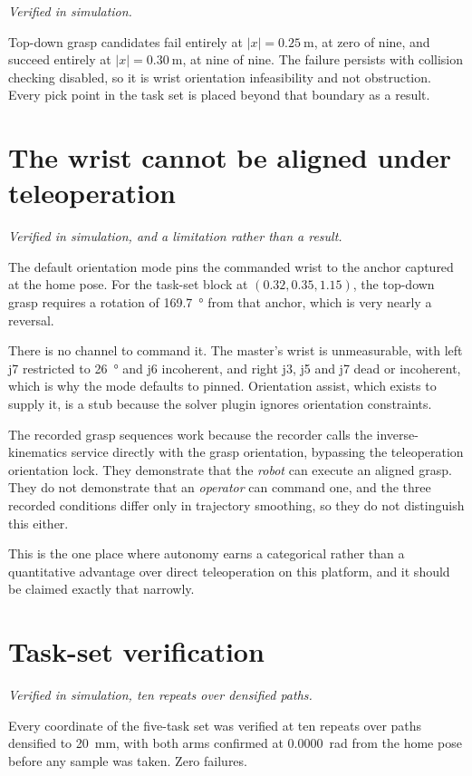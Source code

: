 \emph{Verified in simulation.}

Top-down grasp candidates fail entirely at $|x| = \SI{0.25}{\metre}$, at zero
of nine, and succeed entirely at $|x| = \SI{0.30}{\metre}$, at nine of nine.
The failure persists with collision checking disabled, so it is wrist
orientation infeasibility and not obstruction. Every pick point in the task
set is placed beyond that boundary as a result.

\section{The wrist cannot be aligned under teleoperation}

\emph{Verified in simulation, and a limitation rather than a result.}

The default orientation mode pins the commanded wrist to the anchor captured
at the home pose. For the task-set block at $(0.32, 0.35, 1.15)$, the
top-down grasp requires a rotation of \SI{169.7}{\degree} from that anchor,
which is very nearly a reversal.

There is no channel to command it. The master's wrist is unmeasurable, with
left j7 restricted to \SI{26}{\degree} and j6 incoherent, and right j3, j5 and
j7 dead or incoherent, which is why the mode defaults to pinned. Orientation
assist, which exists to supply it, is a stub because the solver plugin ignores
orientation constraints.

The recorded grasp sequences work because the recorder calls the
inverse-kinematics service directly with the grasp orientation, bypassing the
teleoperation orientation lock. They demonstrate that the \emph{robot} can
execute an aligned grasp. They do not demonstrate that an \emph{operator} can
command one, and the three recorded conditions differ only in trajectory
smoothing, so they do not distinguish this either.

This is the one place where autonomy earns a categorical rather than a
quantitative advantage over direct teleoperation on this platform, and it
should be claimed exactly that narrowly.

\section{Task-set verification}

\emph{Verified in simulation, ten repeats over densified paths.}

Every coordinate of the five-task set was verified at ten repeats over paths
densified to \SI{20}{\milli\metre}, with both arms confirmed at
\SI{0.0000}{\radian} from the home pose before any sample was taken. Zero
failures.

